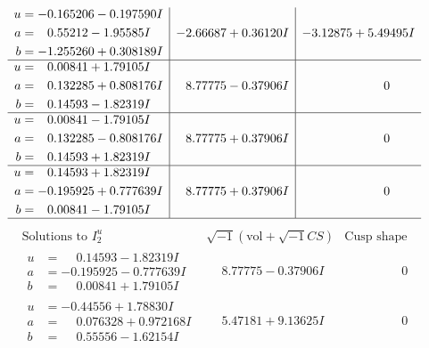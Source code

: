 \documentclass[1p]{elsarticle_modified}
\theoremstyle{definition}
\newcommand{\I}{\sqrt{-1}}
\begin{document}
$$\begin{array}{c|c|c}
\begin{aligned}
u &= -0.165206 - 0.197590 I \\
a &= \phantom{-}0.55212 - 1.95585 I \\
b &= -1.255260 + 0.308189 I\end{aligned}
 & -2.66687 + 0.36120 I & -3.12875 + 5.49495 I \\ \hline\begin{aligned}
u &= \phantom{-}0.00841 + 1.79105 I \\
a &= \phantom{-}0.132285 + 0.808176 I \\
b &= \phantom{-}0.14593 - 1.82319 I\end{aligned}
 & \phantom{-}8.77775 - 0.37906 I & \phantom{-0.000000 } 0 \\ \hline\begin{aligned}
u &= \phantom{-}0.00841 - 1.79105 I \\
a &= \phantom{-}0.132285 - 0.808176 I \\
b &= \phantom{-}0.14593 + 1.82319 I\end{aligned}
 & \phantom{-}8.77775 + 0.37906 I & \phantom{-0.000000 } 0 \\ \hline\begin{aligned}
u &= \phantom{-}0.14593 + 1.82319 I \\
a &= -0.195925 + 0.777639 I \\
b &= \phantom{-}0.00841 - 1.79105 I\end{aligned}
 & \phantom{-}8.77775 + 0.37906 I & \phantom{-0.000000 } 0\\
 \hline 
 \end{array}$$\newpage$$\begin{array}{c|c|c}  
\text{Solutions to }I^u_{2}& \I (\text{vol} + \sqrt{-1}CS) & \text{Cusp shape}\\
 \hline 
\begin{aligned}
u &= \phantom{-}0.14593 - 1.82319 I \\
a &= -0.195925 - 0.777639 I \\
b &= \phantom{-}0.00841 + 1.79105 I\end{aligned}
 & \phantom{-}8.77775 - 0.37906 I & \phantom{-0.000000 } 0 \\ \hline\begin{aligned}
u &= -0.44556 + 1.78830 I \\
a &= \phantom{-}0.076328 + 0.972168 I \\
b &= \phantom{-}0.55556 - 1.62154 I\end{aligned}
 & \phantom{-}5.47181 + 9.13625 I & \phantom{-0.000000 } 0 \\ \hline\begin{aligned}

\end{aligned}
\end{array}$$
\end{document}
